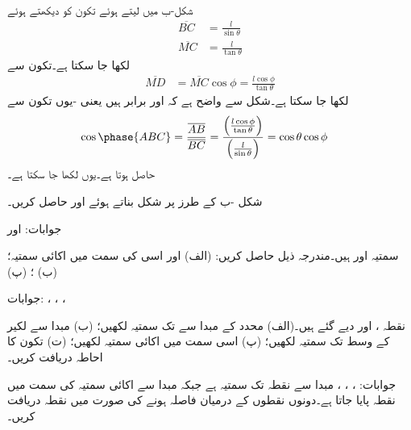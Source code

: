 شکل-ب میں  لیتے ہوئے تکون    کو دیکھتے ہوئے
\begin{align*}
\overline{BC}&=\frac{l}{\sin \theta}   \\
\overline{MC}&=\frac{l}{\tan \theta} 
\end{align*}
لکھا جا سکتا ہے۔تکون  سے
\begin{align*}
\overline{MD}&=\overline{MC} \cos \phi=\frac{l \cos \phi}{\tan \theta} 
\end{align*} 
لکھا جا سکتا ہے۔شکل سے واضح ہے کہ  اور  برابر ہیں یعنی -یوں تکون  سے
\begin{align*}
\cos \phase{ABC}&=\frac{\overline{AB}}{\overline{BC}}=\frac{\left(\frac{l \cos \phi}{\tan \theta}\right)}{\left(\frac{l}{\sin \theta}\right)}=\cos \theta \cos \phi
\end{align*}
حاصل ہوتا ہے۔یوں  لکھا جا سکتا ہے۔

شکل -ب کے طرز پر شکل بناتے ہوئے  اور  حاصل کریں۔

جوابات: اور 

\newpage


سمتیہ  اور  ہیں۔مندرجہ ذیل حاصل کریں: (الف)  اور اسی کی سمت میں اکائی سمتیہ؛ (ب) ؛ (پ) 

جوابات: ، ، ، 

نقطہ ،  اور  دیے گئے ہیں۔(الف) محدد کے مبدا سے  تک سمتیہ لکھیں؛ (ب) مبدا سے لکیر  کے وسط تک سمتیہ لکھیں؛ (پ) اسی سمت میں اکائی سمتیہ لکھیں؛ (ت) تکون  کا احاطہ دریافت کریں۔

جوابات: ، ، ،  
مبدا سے نقطہ  تک سمتیہ  ہے جبکہ مبدا سے  اکائی سمتیہ کی سمت میں نقطہ  پایا جاتا ہے۔دونوں نقطوں کے درمیان  فاصلہ  ہونے کی صورت میں نقطہ  دریافت کریں۔

